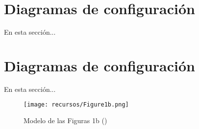 \thispagestyle{empty}
\setcounter{figure}{0}

\section{Diagramas de configuración}
En esta sección...


\section{Diagramas de configuración}
En esta sección...
\begin{figure}[!htbp]
    \centering
    \texttt{[image: recursos/Figure1b.png]}
    \caption{Modelo de las Figuras 1b (\cite{upm56279})}
    \label{fig:figura1aes}
\end{figure}